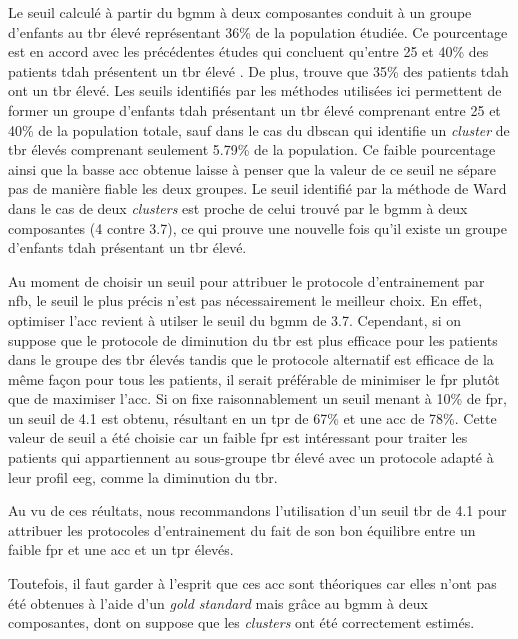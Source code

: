 Le seuil calculé à partir du \gls{bgmm} à deux composantes conduit à un groupe d'enfants au \gls{tbr} élevé représentant 36\% de la population étudiée. 
Ce pourcentage est en accord avec les précédentes études qui concluent qu'entre 25 et 40\% des patients \gls{tdah} présentent un \gls{tbr} élevé \citep{Arns2012}. 
De plus,\citep{Clarke2011} trouve que 35\% des patients \gls{tdah} ont un \gls{tbr} élevé. 
Les seuils identifiés par les méthodes utilisées ici permettent de former un groupe d'enfants \gls{tdah} présentant un \gls{tbr} élevé comprenant entre
25 et 40\% de la population totale, sauf dans le cas du \gls{dbscan} qui identifie un \textit{cluster}
de \gls{tbr} élevés comprenant seulement 5.79\% de la population. Ce faible pourcentage ainsi que la basse \gls{acc} obtenue laisse à penser
que la valeur de ce seuil ne sépare pas de manière fiable les deux groupes. Le seuil identifié par la méthode de Ward dans le cas de deux \textit{clusters}
est proche de celui trouvé par le \gls{bgmm} à deux composantes (4 contre 3.7), ce qui prouve une nouvelle fois qu'il existe un groupe d'enfants \gls{tdah}
présentant un \gls{tbr} élevé.

Au moment de choisir un seuil pour attribuer le protocole d'entrainement par \gls{nfb}, le seuil le plus précis n'est pas nécessairement le meilleur choix.
En effet, optimiser l'\gls{acc} revient à utilser le seuil du \gls{bgmm} de 3.7. Cependant, si on suppose que le protocole de diminution du \gls{tbr} est plus 
efficace pour les patients dans le groupe des \gls{tbr} élevés tandis que le protocole alternatif est efficace de la même façon pour tous les patients, il 
serait préférable de minimiser le \gls{fpr} plutôt que de maximiser l'\gls{acc}. Si on fixe raisonnablement un seuil menant à 10\% de \gls{fpr}, un seuil de 4.1
est obtenu, résultant en un \gls{tpr} de 67\% et une \gls{acc} de 78\%. Cette valeur de seuil a été choisie car un faible \gls{fpr} est intéressant pour traiter 
les patients qui appartiennent au sous-groupe \gls{tbr} élevé avec un protocole adapté à leur profil \gls{eeg}, comme la diminution du \gls{tbr}.

Au vu de ces réultats, nous recommandons l'utilisation d'un seuil \gls{tbr} de 4.1 pour attribuer
les protocoles d'entrainement du fait de son bon équilibre entre un faible \gls{fpr} et une \gls{acc} et un \gls{tpr} élevés. 

Toutefois, il faut garder à l'esprit que ces \gls{acc} sont théoriques car elles n'ont pas été obtenues à l'aide d'un \textit{gold standard} mais grâce au \gls{bgmm}
à deux composantes, dont on suppose que les \textit{clusters} ont été correctement estimés. 

